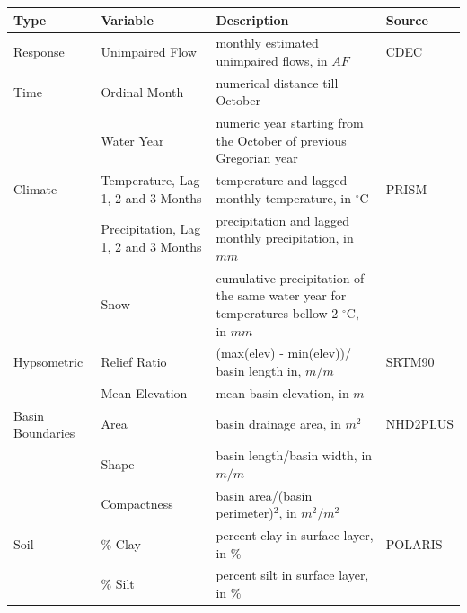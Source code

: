 \begingroup
	\renewcommand{\arraystretch}{1.2} 
	\linespread{1.0}
	\footnotesize 
	\centering
	\begin{longtable}[h]{p{2cm}p{2.55cm}p{8.04cm}p{2.24cm}}
	Type & Variable & Description & Source \\
	\hline
	\endhead
	Response & Unimpaired Flow & monthly estimated unimpaired flows, in $AF$ & CDEC \cite{beaudette2016package} \\
	\hline
	Time & Ordinal Month & numerical distance till October & \\
	& Water Year & numeric year starting from the October of previous Gregorian year & \\
	\hline
	Climate & Temperature, Lag 1, 2 and 3 Months & temperature and lagged monthly temperature, in $^{\circ}$C & PRISM  \cite{prism} \\
	& Precipitation, Lag 1, 2 and 3 Months & precipitation and lagged monthly precipitation, in $mm$ &  \\  
	& Snow & cumulative precipitation of the same water year for temperatures bellow 2 $^{\circ}$C, in $mm$& \\
	\hline
	Hypsometric & Relief Ratio & (max(elev) - min(elev))/ basin length in, $m/m$ & SRTM90 \cite{jarvis2008hole}\\
	& Mean Elevation & mean basin elevation, in $m$ & \\
	\hline
	Basin Boundaries & Area & basin drainage area, in $m^2$ & NHD2PLUS \cite{mckay2012nhdplus}\\
	& Shape & basin length/basin width, in $m/m$ &  \\
	 & Compactness & basin area/(basin perimeter)$^2$, in $m^2/m^2$ &  \\
	\hline
	Soil & \% Clay & percent clay in surface layer, in $\%$ & POLARIS \cite{chaney2016polaris} \\
	 & \% Silt & percent silt in surface layer, in $\%$ &  \\

\end{longtable}
